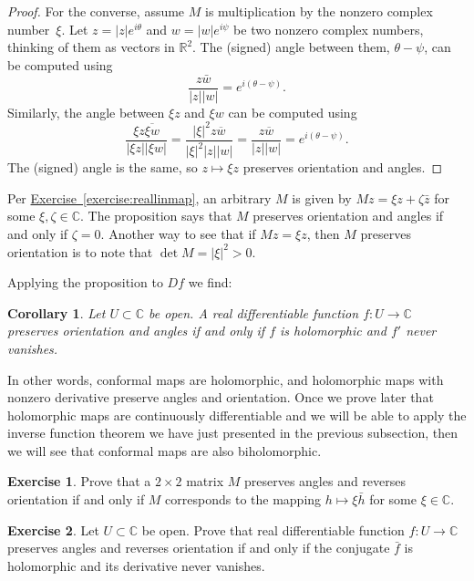 \documentclass[12pt,openany]{book}
\newcommand{\sabs}[1]{\lvert {#1} \rvert}
\newcommand{\C}{{\mathbb{C}}}
\newcommand{\R}{{\mathbb{R}}}
\theoremstyle{plain}
\newtheorem{cor}[thm]{Corollary}
\theoremstyle{remark}
\theoremstyle{definition}
\newenvironment{exbox}{%
    \def\FrameCommand{\vrule width 1pt \relax\hspace{10pt}}%
    \MakeFramed{\advance\hsize-\width\FrameRestore}%
}{%
    \endMakeFramed
}
\theoremstyle{exercise}
\newtheorem{exercise}{Exercise}[section]
\theoremstyle{example}
\newcommand{\exerciseref}[1]{\hyperref[#1]{Exercise~\ref*{#1}}}
\begin{document}
\begin{proof}
For the converse, assume $M$ is multiplication by the
nonzero complex number~$\xi$.
Let
$z = \sabs{z} e^{i\theta}$ and $w = \sabs{w} e^{i\psi}$ be two nonzero
complex numbers, thinking of them as vectors in $\R^2$.
The (signed) angle between them, $\theta-\psi$, can be
computed using
\begin{equation*}
\frac{z\bar{w}}{\sabs{z}\sabs{w}}
=
e^{i(\theta-\psi)} .
\end{equation*}
Similarly, the angle between 
$\xi z$ and $\xi w$ can be computed using
\begin{equation*}
\frac{\xi z\overline{\xi w}}{\sabs{\xi z}\sabs{\xi w}} 
=
\frac{\sabs{\xi}^2 z\overline{w}}{\sabs{\xi}^2 \sabs{z}\sabs{w}} 
=
\frac{z\overline{w}}{\sabs{z}\sabs{w}} = e^{i(\theta-\psi)}.
\end{equation*}
The (signed) angle is the same, so $z \mapsto \xi z$ preserves
orientation and angles.
\end{proof}

Per \exerciseref{exercise:reallinmap},
an arbitrary $M$ is given by
$Mz = \xi z + \zeta \bar{z}$ for some $\xi,\zeta \in \C$.
The proposition says that $M$ preserves orientation and angles if and only
if $\zeta=0$.
Another way to see that if $Mz = \xi z$, then
$M$ preserves orientation is to note that
$\det M = \sabs{\xi}^2 > 0$.

Applying the proposition to $Df$ we find:

\begin{cor}
Let $U \subset \C$ be open.
A real differentiable function $f \colon U \to \C$
preserves orientation and angles
if and only if $f$ is holomorphic and $f'$ never vanishes.
\end{cor}

In other words, conformal maps are holomorphic, and holomorphic
maps with nonzero derivative preserve angles and orientation.
Once we prove later that
holomorphic maps are continuously differentiable and we will be able to
apply the inverse function theorem we have just presented in the previous
subsection, then we will see that conformal maps are also biholomorphic.

\begin{exbox}
\begin{exercise}
Prove that a $2 \times 2$ matrix $M$ preserves angles and reverses
orientation if and only if $M$ corresponds to the mapping $h \mapsto \xi
\bar{h}$ for some $\xi \in \C$.
\end{exercise}

\begin{exercise}
Let $U \subset \C$ be open.
Prove that real differentiable function $f \colon U \to \C$ preserves angles
and reverses orientation if and only if the conjugate $\bar{f}$ is
holomorphic and its derivative never vanishes.
\end{exercise}
\end{exbox}
\end{document}
